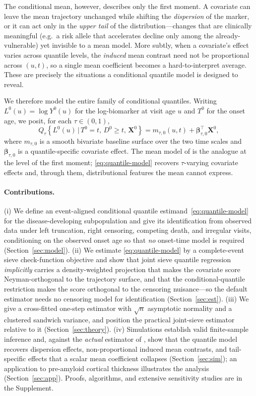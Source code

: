 \documentclass[11pt]{article}
\newcommand{\X}{\bm{X}}
\newcommand{\bbeta}{\bm{\beta}}
\newcommand{\given}{\,\vert\,}
\begin{document}
The conditional mean, however, describes only the first moment. A covariate can
leave the mean trajectory unchanged while shifting the \emph{dispersion} of the
marker, or it can act only in the \emph{upper tail} of the distribution---changes
that are clinically meaningful (e.g.\ a risk allele that accelerates decline only
among the already-vulnerable) yet invisible to a mean model. More subtly, when a
covariate's effect varies across quantile levels, the \emph{induced} mean contrast
need not be proportional across $(u,t)$, so a single mean coefficient becomes a
hard-to-interpret average. These are precisely the situations a conditional
quantile model is designed to reveal.

We therefore model the entire family of conditional quantiles. Writing
$L^0(u)=\log Y^0(u)$ for the log-biomarker at visit age $u$ and $T^0$ for the
onset age, we posit, for each $\tau\in(0,1)$,
\begin{equation}
Q_\tau\!\left\{L^0(u)\given T^0=t,\,D^0\ge t,\,\X^0\right\}
   = m_{\tau,0}(u,t)+\bbeta_{\tau,0}^\top\X^0 ,
\label{eq:quantile-model}
\end{equation}
where $m_{\tau,0}$ is a smooth bivariate baseline surface over the two time scales
and $\bbeta_{\tau,0}$ is a quantile-specific covariate effect. The mean model of
\citet{sun2025semiparametric} is the analogue at the level of the first moment;
\eqref{eq:quantile-model} recovers $\tau$-varying covariate effects and, through
them, distributional features the mean cannot express.

\paragraph{Contributions.} (i) We define an event-aligned conditional quantile
estimand~\eqref{eq:quantile-model} for the disease-developing subpopulation and
give its identification from observed data under left truncation, right censoring,
competing death, and irregular visits, conditioning on the observed onset age so
that \emph{no} onset-time model is required (Section~\ref{sec:model}). (ii) We
estimate \eqref{eq:quantile-model} by a complete-event sieve check-function
objective and show that joint sieve quantile regression \emph{implicitly} carries
a density-weighted projection that makes the covariate score Neyman-orthogonal to
the trajectory surface, and that the conditional-quantile restriction makes the
score orthogonal to the censoring nuisance---so the default estimator needs no
censoring model for identification (Section~\ref{sec:est}). (iii) We give a
cross-fitted one-step estimator with $\sqrt n$ asymptotic normality and a
clustered sandwich variance, and position the practical joint-sieve estimator
relative to it (Section~\ref{sec:theory}). (iv) Simulations establish valid
finite-sample inference and, against the \emph{actual} estimator of
\citet{sun2025semiparametric}, show that the quantile model recovers dispersion
effects, non-proportional induced mean contrasts, and tail-specific effects that
a scalar mean coefficient collapses (Section~\ref{sec:sim}); an application to
pre-amyloid cortical thickness illustrates the analysis (Section~\ref{sec:app}).
Proofs, algorithms, and extensive sensitivity studies are in the Supplement.
\end{document}
